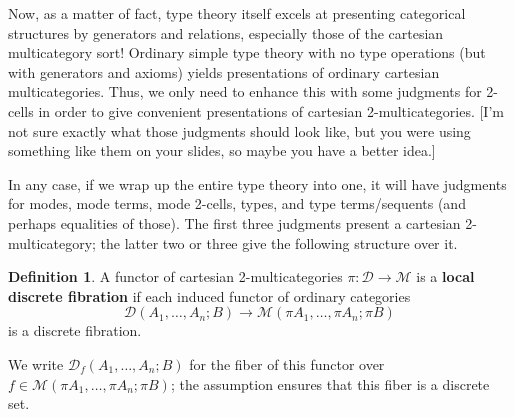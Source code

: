 \documentclass{amsart}
\theoremstyle{definition}
\newtheorem{defn}[thm]{Definition}
\def\M{\mathcal{M}}
\def\D{\mathcal{D}}
\begin{document}
Now, as a matter of fact, type theory itself excels at presenting categorical structures by generators and relations, especially those of the cartesian multicategory sort!
Ordinary simple type theory with no type operations (but with generators and axioms) yields presentations of ordinary cartesian multicategories.
Thus, we only need to enhance this with some judgments for 2-cells in order to give convenient presentations of cartesian 2-multicategories.
[I'm not sure exactly what those judgments should look like, but you were using something like them on your slides, so maybe you have a better idea.]

In any case, if we wrap up the entire type theory into one, it will have judgments for modes, mode terms, mode 2-cells, types, and type terms/sequents (and perhaps equalities of those).
The first three judgments present a cartesian 2-multicategory; the latter two or three give the following structure over it.

\begin{defn}
  A functor of cartesian 2-multicategories $\pi:\D\to\M$ is a \textbf{local discrete fibration} if each induced functor of ordinary categories
  \[\D(A_1,\dots,A_n;B)\to\M(\pi A_1,\dots,\pi A_n;\pi B)\]
  is a discrete fibration.
\end{defn}

We write $\D_f(A_1,\dots,A_n;B)$ for the fiber of this functor over $f\in \M(\pi A_1,\dots,\pi A_n;\pi B)$; the assumption ensures that this fiber is a discrete set.
\end{document}
